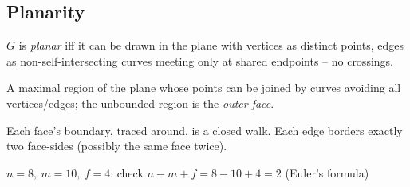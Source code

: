 \documentclass[11pt]{article}
\begin{document}
\subsection{Planarity}
\label{sec:12-5}

\begin{definition}
$G$ is \emph{planar} iff it can be drawn in the plane with vertices as distinct points, edges as non-self-intersecting curves meeting only at shared endpoints -- no crossings.
\end{definition}

\begin{definition}[Face]
A maximal region of the plane whose points can be joined by curves avoiding all vertices/edges; the unbounded region is the \emph{outer face}.
\end{definition}

\begin{note}
Each face's boundary, traced around, is a closed walk. Each edge borders exactly two face-sides (possibly the same face twice).
\end{note}

\begin{center}
\end{center}
\begin{center}
\small $n=8,\ m=10,\ f=4$: check $n-m+f = 8-10+4=2$ (Euler's formula)
\end{center}
\end{document}
